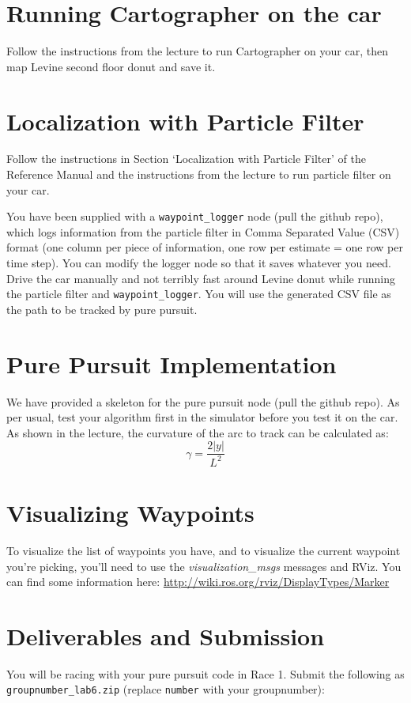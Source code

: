 \documentclass[letta4 paper]{article}
\numberwithin{equation}{section}
\newcommand{\0}{\mathbf{0}}
\begin{document}
	\section{Running Cartographer on the car}
	Follow the instructions from the lecture to run Cartographer on your car, then map Levine second floor donut and save it.
	
	
	\section{Localization with Particle Filter}
	Follow the instructions in Section `Localization with Particle Filter' of the Reference Manual and the instructions from the lecture to run particle filter on your car.
	
	
	\noindent You have been supplied with a \texttt{waypoint\_logger} node (pull the github repo), which logs information from the particle filter in Comma Separated Value (CSV) format (one column per piece of information, one row per estimate = one row per time step). You can modify the logger node so that it saves whatever you need. Drive the car manually and not terribly fast around Levine donut while running the particle filter and \texttt{waypoint\_logger}. You will use the generated CSV file as the path to be tracked by pure pursuit.
	
	
	\section{Pure Pursuit Implementation}
	We have provided a skeleton for the pure pursuit node (pull the github repo). As per usual, test your algorithm first in the simulator before you test it on the car. As shown in the lecture, the curvature of the arc to track can be calculated as:
	\begin{equation}
	\gamma = \frac{2|y|}{L^2}
	\end{equation}
	
	
	\section{Visualizing Waypoints}
	To visualize the list of waypoints you have, and to visualize the current waypoint you're picking, you'll need to use the \textit{visualization\_msgs} messages and RViz. You can find some information here: \href{http://wiki.ros.org/rviz/DisplayTypes/Marker}{http://wiki.ros.org/rviz/DisplayTypes/Marker}
	

	\section{Deliverables and Submission}
	You will be racing with your pure pursuit code in Race 1.
	Submit the following as \texttt{groupnumber\_lab6.zip} (replace \texttt{number} with your groupnumber):
	
\end{document}
